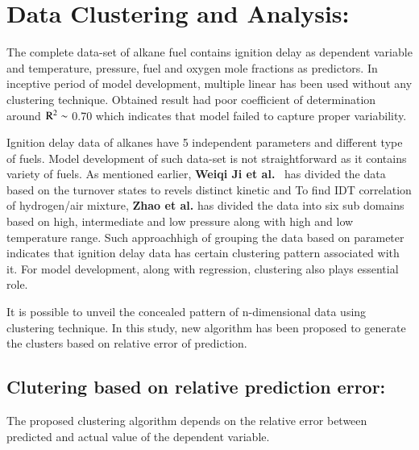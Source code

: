\documentclass[preprint,12pt]{elsarticle}
\begin{document}
					\section{Data Clustering and Analysis:}
					  The complete data-set of alkane fuel contains ignition delay as dependent  variable and temperature, pressure, fuel and oxygen mole fractions as predictors. In inceptive period of model development, multiple linear has been used without any  clustering technique. Obtained result had  poor coefficient of determination around $\rm R^2 \sim$ 0.70 which indicates that model failed to capture proper variability.
					  
					Ignition delay data of alkanes have 5 independent parameters and different type of fuels. Model development of such data-set is not straightforward as it contains variety of fuels. As mentioned earlier, \textbf{Weiqi Ji et al.}~\cite{ji2016controlling} has divided the data based on the turnover states to revels distinct kinetic and To find IDT correlation  of hydrogen/air mixture, \textbf{Zhao et al.} \cite{zhao2011correlations} has divided the data into six sub domains based on high, intermediate and low pressure along with high and low temperature range. Such approachhigh of grouping the data based on parameter indicates that ignition delay data has certain clustering pattern associated with it. For model development, along with regression, clustering also plays essential role. 
					
				It is possible to unveil the concealed pattern of n-dimensional data using  clustering technique. In this study, new algorithm has been proposed to generate the clusters based on relative error of prediction. 
				
				\subsection{Clutering based on relative prediction error:}
				The proposed clustering  algorithm depends on the relative error between predicted and  actual  value of the dependent variable.
				
\end{document}
